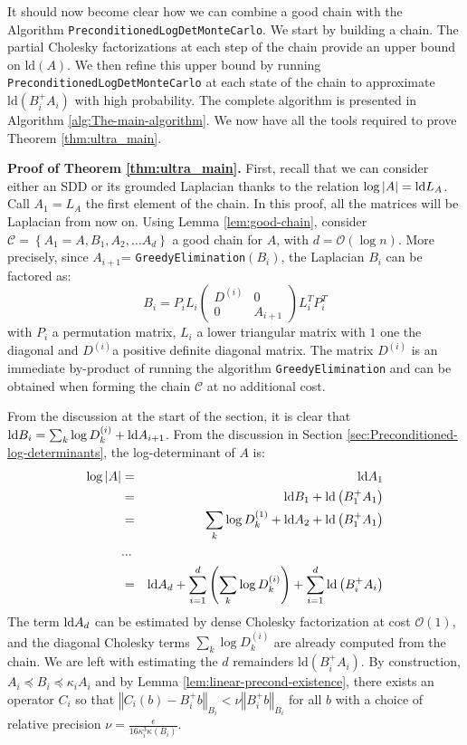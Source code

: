 It should now become clear how we can combine a good chain with the
Algorithm \texttt{PreconditionedLogDetMonteCarlo}. We start by building
a chain. The partial Cholesky factorizations at each step of the chain
provide an upper bound on $\mbox{ld}\left(A\right)$. We then refine
this upper bound by running \texttt{Preconditioned\-LogDetMonteCarlo}
at each state of the chain to approximate $\mbox{ld}\left(B_{i}^{+}A_{i}\right)$
with high probability. The complete algorithm is presented in Algorithm
\ref{alg:The-main-algorithm}. We now have all the tools required
to prove Theorem \ref{thm:ultra_main}.

\textbf{Proof of Theorem \ref{thm:ultra_main}.} First, recall that
we can consider either an SDD or its grounded Laplacian thanks to
the relation $\log |A|=\text{\textnormal{ld}} L_{A}$. Call $A_{1}=L_{A}$ the first element
of the chain. In this proof, all the matrices will be Laplacian from
now on. Using Lemma \ref{lem:good-chain}, consider $\mathcal{C}=\left\{ A_{1}=A,B_{1},A_{2},\dots A_{d}\right\} $
a good chain for $A$, with $d=\mathcal{O}\left(\log n\right)$. More
precisely, since $A_{i+1}$= \texttt{Greedy\-Elimination}$\left(B_{i}\right)$,
the Laplacian $B_{i}$ can be factored as: 
\[
B_{i}=P_{i}L_{i}\left(\begin{array}{cc}
D^{\left(i\right)} & 0\\
0 & A_{i+1}
\end{array}\right)L_{i}^{T}P_{i}^{T}
\]
with $P_{i}$ a permutation matrix, $L_{i}$ a lower triangular matrix
with $1$ one the diagonal and $D^{\left(i\right)}$a positive definite
diagonal matrix. The matrix $D^{\left(i\right)}$ is an immediate
by-product of running the algorithm \texttt{GreedyElimination} and
can be obtained when forming the chain $\mathcal{C}$ at no additional
cost.

From the discussion at the start of the section, it is clear that
$\text{\textnormal{ld}} B_{i}=\sum_{k}\log D_{k}^{\left(i\right)}+\text{\textnormal{ld}} A_{i+1}$. From
the discussion in Section \ref{sec:Preconditioned-log-determinants},
the log-determinant of $A$ is: 
\begin{eqnarray*}
\log |A| & = & \text{\textnormal{ld}} A_{1}\\
 & = & \text{\textnormal{ld}} B_{1}+\text{\textnormal{ld}}\left(B_{1}^{+}A_{1}\right)\\
 & = & \sum_{k}\log D_{k}^{\left(1\right)}+\text{\textnormal{ld}} A_{2}+\text{\textnormal{ld}}\left(B_{1}^{+}A_{1}\right)\\
 & ... & \\
 & = & \text{\textnormal{ld}} A_{d}+\sum_{i=1}^{d}\left(\sum_{k}\log D_{k}^{\left(i\right)}\right)+\sum_{i=1}^{d}\text{\textnormal{ld}}\left(B_{i}^{+}A_{i}\right)
\end{eqnarray*}
The term $\text{\textnormal{ld}} A_{d}$ can be estimated by dense Cholesky factorization
at cost $\mathcal{O}\left(1\right)$, and the diagonal Cholesky terms
$\sum_{k}\log D_{k}^{\left(i\right)}$ are already computed from the
chain. We are left with estimating the $d$ remainders $\text{ld}\left(B_{i}^{+}A_{i}\right)$.
By construction, $A_{i}\preceq B_{i}\preceq\kappa_{i}A_{i}$ and by
Lemma \ref{lem:linear-precond-existence}, there exists an operator
$C_{i}$ so that $\left\Vert C_{i}\left(b\right)-B_{i}^{+}b\right\Vert _{B_{i}}<\nu\left\Vert B_{i}^{+}b\right\Vert _{B_{i}}$
for all $b$ with a choice of relative precision $\nu=\frac{\epsilon}{16\kappa_{i}^{3}\kappa\left(B_{i}\right)}$.

